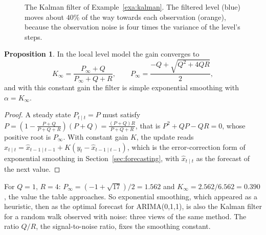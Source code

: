 \documentclass[11pt,a4paper]{article}
\theoremstyle{definition}
\newtheorem{prop}[thm]{Proposition}
\begin{document}
\begin{figure}[H]
\centering
{}
\caption{The Kalman filter of Example~\ref{exa:kalman}. The filtered level (blue) moves about $40\%$ of the way towards each
observation (orange), because the observation noise is four times the variance of the level's steps.}
\label{fig:kalman}
\end{figure}

\begin{prop}\label{prop:kalman-ses}
In the local level model the gain converges to
\[
K_\infty = \frac{P_\infty + Q}{P_\infty + Q + R} , \qquad P_\infty = \frac{-Q + \sqrt{Q^2 + 4QR}}{2} ,
\]
and with this constant gain the filter is simple exponential smoothing with $\alpha = K_\infty$.
\end{prop}

\begin{proof}
A steady state $P_{t\mid t} = P$ must satisfy $P = (1 - \frac{P+Q}{P+Q+R})(P + Q) = \frac{(P+Q)R}{P+Q+R}$, that is $P^2 + QP - QR = 0$, whose positive root is $P_\infty$. With
constant gain $K$, the update reads $\hat x_{t\mid t} = \hat x_{t-1\mid t-1} + K(y_t - \hat x_{t-1\mid t-1})$, which is the error-correction form of exponential smoothing
in Section~\ref{sec:forecasting}, with $\hat x_{t\mid t}$ as the forecast of the next value.
\end{proof}

For $Q = 1$, $R = 4$: $P_\infty = (-1 + \sqrt{17})/2 = 1.562$ and $K_\infty = 2.562/6.562 = 0.390$, the value the table approaches. So exponential smoothing,
which appeared as a heuristic, then as the optimal forecast for ARIMA(0,1,1), is also the Kalman filter for a
random walk observed with noise: three views of the same method. The ratio $Q/R$, the signal-to-noise ratio,
fixes the smoothing constant.
\end{document}
